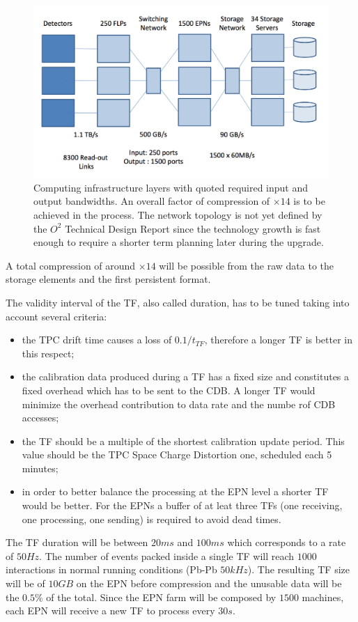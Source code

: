 \begin{figure}[]
\begin{center}
\includegraphics[width=0.75\linewidth]{Chapters/O2/Figs/Compression.png}
\caption{Computing infrastructure layers with quoted required input and output bandwidths. An overall factor of compression of $\times14$ is to be achieved in the process. The network topology is not yet defined by the $O^2$ Technical Design Report since the technology growth is fast enough to require a shorter term planning later during the upgrade.}
\label{fig:O2_TF}
\end{center}
\end{figure}

A total compression of around $\times14$ will be possible from the raw data to the storage elements and the first persistent format.

The validity interval of the TF, also called duration, has to be tuned taking into account several criteria:
\begin{itemize}
    \item the TPC drift time causes a loss of $0.1/t_{TF}$, therefore a longer TF is better in this respect;
    \item the calibration data produced during a TF has a fixed size and constitutes a fixed overhead which has to be sent to the CDB. A longer TF would minimize the overhead contribution to data rate and the numbe rof CDB accesses;
    \item the TF should be a multiple of the shortest calibration update period. This value should be the TPC Space Charge Distortion one, scheduled each 5 minutes;
    \item in order to better balance the processing at the EPN level a shorter TF would be better. For the EPNs a buffer of at leat three TFs (one receiving, one processing, one sending) is required to avoid dead times.
\end{itemize}
The TF duration will be between $20ms$ and $100ms$ which corresponds to a rate of $50Hz$.
The number of events packed inside a single TF will reach $1000$ interactions in normal running conditions (Pb-Pb $50kHz$).
The resulting TF size will be of $10GB$ on the EPN before compression and the unusable data will be the $0.5\%$ of the total.
Since the EPN farm will be composed by $1500$ machines, each EPN will receive a new TF to process every $30s$.

